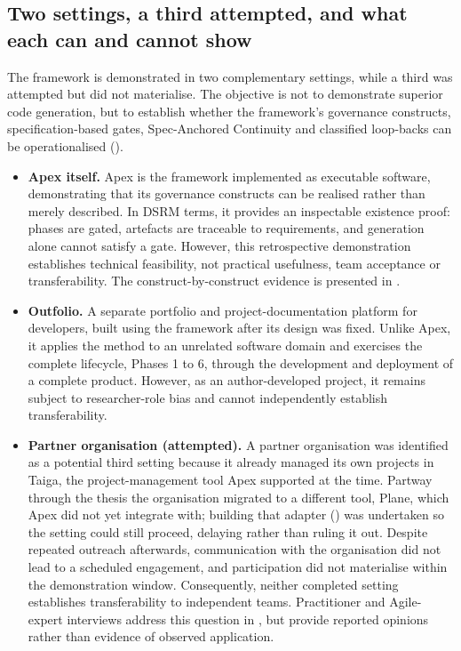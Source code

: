 \subsection*{Two settings, a third attempted, and what each can and cannot show}
The framework is demonstrated in two complementary settings, while a third was attempted but did not materialise. The objective is not to demonstrate superior code generation, but to establish whether the framework's governance constructs, specification-based gates, Spec-Anchored Continuity and classified loop-backs can be operationalised ().

\begin{itemize}[leftmargin=0.6cm, itemsep=0.4em]

\item \textbf{Apex itself.} Apex is the framework implemented as executable software, demonstrating that its governance constructs can be realised rather than merely described. In \ac{DSRM} terms, it provides an inspectable existence proof: phases are gated, artefacts are traceable to requirements, and generation alone cannot satisfy a gate. However, this retrospective demonstration establishes technical feasibility, not practical usefulness, team acceptance or transferability. The construct-by-construct evidence is presented in .

\item \textbf{Outfolio.} A separate portfolio and project-documentation platform for developers, built using the framework after its design was fixed. Unlike Apex, it applies the method to an unrelated software domain and exercises the complete lifecycle, Phases 1 to 6, through the development and deployment of a complete product. However, as an author-developed project, it remains subject to researcher-role bias and cannot independently establish transferability.

\item \textbf{Partner organisation (attempted).} A partner organisation was identified as a potential third setting because it already managed its own projects in Taiga, the project-management tool Apex supported at the time. Partway through the thesis the organisation migrated to a different tool, Plane, which Apex did not yet integrate with; building that adapter () was undertaken so the setting could still proceed, delaying rather than ruling it out. Despite repeated outreach afterwards, communication with the organisation did not lead to a scheduled engagement, and participation did not materialise within the demonstration window. Consequently, neither completed setting establishes transferability to independent teams. Practitioner and Agile-expert interviews address this question in , but provide reported opinions rather than evidence of observed application.

\end{itemize}

